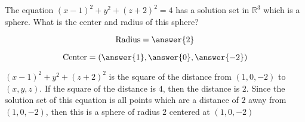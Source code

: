 \documentclass{ximera}
\begin{document}
\begin{question}
	The equation $(x-1)^2+y^2+(z+2)^2 = 4$ has a solution set in $\mathbb{R}^3$ which is a sphere.  What is the center and radius of this sphere?
	
\[
\textrm{Radius} = \answer{2}
\]

\[
\textrm{Center} = \left(\answer{1},\answer{0}, \answer{-2} \right)
\]

\begin{hint}
	$(x-1)^2+y^2+(z+2)^2$ is the square of the distance from $(1,0,-2)$ to $(x,y,z)$.  If the square of the distance is $4$, then the distance is $2$.  Since the solution set of this equation is all points which are a distance of $2$ away from $(1,0,-2)$, then this is a sphere of radius $2$ centered at $(1,0,-2)$
\end{hint}
\end{question}
\end{document}
